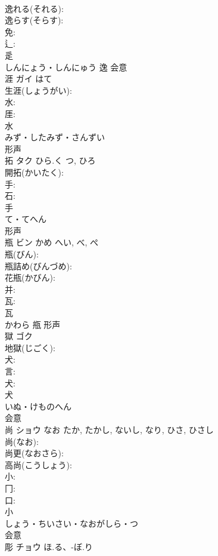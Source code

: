 \documentclass[8pt]{extreport}
\begin{document}
\begin{CJK}{UTF8}{min}
\\	逸れる(それる): 
\\	逸らす(そらす): 
\\	免: 
\\	辶: 
\\	辵	
\\	しんにょう・しんにゅう	逸	会意 
\\	涯	ガイ	はて		
\\	生涯(しょうがい): 
\\	水: 
\\	厓: 
\\	水	
\\	みず・したみず・さんずい	
\\	形声 
\\	拓	タク	ひら.く	つ, ひろ	
\\	開拓(かいたく): 
\\	手: 
\\	石: 
\\	手	
\\	て・てへん	
\\	形声 
\\	瓶	ビン	かめ	へい, べ, ぺ	
\\	瓶(びん): 
\\	瓶詰め(びんづめ): 
\\	花瓶(かびん): 
\\	并: 
\\	瓦: 
\\	瓦	
\\	かわら	甁	形声 
\\	獄	ゴク			
\\	地獄(じごく): 
\\	犬: 
\\	言: 
\\	犬: 
\\	犬	
\\	いぬ・けものへん	
\\	会意 
\\	尚	ショウ	なお	たか, たかし, ないし, なり, ひさ, ひさし	
\\	尚(なお): 
\\	尚更(なおさら): 
\\	高尚(こうしょう): 
\\	小: 
\\	冂: 
\\	口: 
\\	小	
\\	しょう・ちいさい・なおがしら・つ	
\\	会意 
\\	彫	チョウ	ほ.る、-ぼ.り		

\end{CJK}
\end{document}
